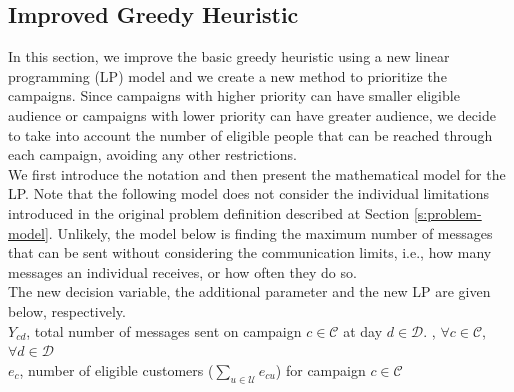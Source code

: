 \documentclass[11pt]{article}
\begin{document}
\subsection{Improved Greedy Heuristic} \label{s:greedy_heuristic_improved}
In this section, we improve the basic greedy heuristic using a new linear programming (LP) model and we create a new method to prioritize the campaigns. Since campaigns with higher priority can have smaller eligible audience or campaigns with lower priority can have greater audience, we decide to take into account the number of eligible people that can be reached through each campaign, avoiding any other restrictions.
\\
We first introduce the notation and then present the mathematical model for the LP. Note that the following model does not consider the individual limitations introduced in the original problem definition described at Section \s\ref{s:problem-model}. Unlikely, the model below is finding the maximum number of messages that can be sent without considering the communication limits, i.e., how many messages an individual receives, or how often they do so.\\

\noindent The new decision variable, the additional parameter and the new LP are given below, respectively. \\

\noindent $Y_{{c}{d}}$, total number of messages sent on campaign $c \in \mathcal{C}$ at day $d \in \mathcal{D}$.
, $\forall c \in \mathcal{C}$, $\forall d \in \mathcal{D}$ \\
\noindent $e_{c}$, number of eligible customers ($\sum\limits_{u\in\mathcal{U}}e_{{c}{u}}$) for campaign $c \in \mathcal{C}$
\end{document}
